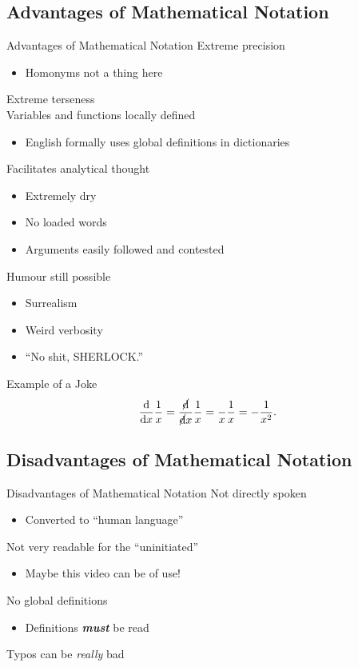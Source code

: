 \documentclass{beamer}
\begin{document}
		\subsection{Advantages of Mathematical Notation}
			\begin{frame}{Advantages of Mathematical Notation}
				Extreme precision\\
				\begin{itemize}
					\item Homonyms not a thing here
				\end{itemize}
				Extreme terseness\\
				Variables and functions locally defined
				\begin{itemize}
					\item English formally uses global definitions in dictionaries
				\end{itemize}
				Facilitates analytical thought
				\begin{itemize}
					\item Extremely dry
					\item No loaded words
					\item Arguments easily followed and contested
				\end{itemize}
				Humour still possible
				\begin{itemize}
					\item Surrealism
					\item Weird verbosity
					\item ``No shit, SHERLOCK.''
				\end{itemize}
			\end{frame}
			\begin{frame}{Example of a Joke}
				\[
					\frac{\textrm{d}}{\textrm{d}x} \frac{1}{x} =
          \frac{\cancel{\textrm{d}}}{\cancel{\textrm{d}}x} \frac{1}{x} =
          \frac{}{x} \frac{1}{x} =
          -\frac{1}{x^2}.
				\]
			\end{frame}
		\subsection{Disadvantages of Mathematical Notation}
			\begin{frame}{Disadvantages of Mathematical Notation}
				Not directly spoken
				\begin{itemize}
					\item Converted to ``human language''
				\end{itemize}
				Not very readable for the ``uninitiated''
				\begin{itemize}
					\item Maybe this video can be of use!
				\end{itemize}
				No global definitions
				\begin{itemize}
					\item Definitions \textit{\textbf{must}} be read
				\end{itemize}
				Typos can be \textit{really} bad
			\end{frame}
\end{document}
